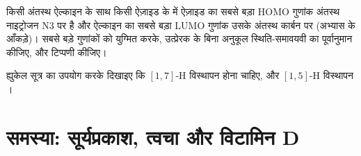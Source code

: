 \begin{exercise}[$\star\star\star$]\label{exo:b3:pericyclic:11}
किसी अंतस्थ ऐल्काइन के साथ किसी ऐज़ाइड के  में ऐज़ाइड का सबसे बड़ा
HOMO गुणांक अंतस्थ नाइट्रोजन N3 पर है और ऐल्काइन का सबसे बड़ा
LUMO गुणांक उसके अंतस्थ कार्बन पर (अभ्यास के आँकड़े)।
सबसे बड़े गुणांकों को युग्मित करके, उत्प्रेरक के बिना अनुकूल स्थिति-समावयवी का पूर्वानुमान कीजिए, और
टिप्पणी कीजिए।
\end{exercise}

\begin{exercise}[$\star\star\star$]\label{exo:b3:pericyclic:12}
ह्युकेल सूत्र का उपयोग करके दिखाइए कि $[1,7]$-H विस्थापन  होना चाहिए,
और $[1,5]$-H विस्थापन ।
\end{exercise}

\clearpage
\enlargethispage{3\baselineskip}
\section{समस्या: सूर्यप्रकाश, त्वचा और विटामिन D}

